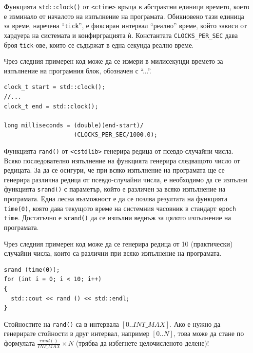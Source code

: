 \documentclass[12pt,a4paper]{article}
\newcommand{\code}[1]{\texttt{#1}}
\begin{document}
{\begin{enumerate}[resume]
\end{enumerate}

\begin{mdframed}[hidealllines=true,backgroundcolor=gray!20]
Функцията \code{std::clock()} от \code{<ctime>} връща в абстрактни единици времето, което е изминало от началото на изпълнение на програмата. Обикновено тази единица за време, наречена ``\code{tick}'', е фиксиран интервал ``реално'' време, който зависи от хардуера на системата и конфирграцията ѝ. Константата \code{CLOCKS\_PER\_SEC} дава броя \code{tick}-ове, които се съдържат в една секунда реално време.

Чрез следния примерен код може да се измери в милисекунди времето за изпълнение на програмния блок, обозначен с ``...''.
\begin{verbatim}
clock_t start = std::clock();
//...
clock_t end = std::clock();

long milliseconds = (double)(end-start)/
                    (CLOCKS_PER_SEC/1000.0);

\end{verbatim}
\end{mdframed}
\begin{mdframed}[hidealllines=true,backgroundcolor=gray!20]
Функцията \code{rand()} от \code{<cstdlib>} генерира редица от псевдо-случайни числа. Всяко последователно изпълнение на функцията генерира следващото число от редицата. За да се осигури, че при всяко изпълнение на програмата ще се генерира различна редица от псевдо-случайни числа, е необходимо да се изпълни функцията \code{srand()} с параметър, който е различен за всяко изпълнение на програмата. Една лесна възможност е да се позлва резултата на функцията \code{time(0)}, която дава текущото време на системния часовник в стандарт \code{epoch time}. Достатъчно е \code{srand()} да се изпълни веднъж за цялото изпълнение на програмата.

Чрез следния примерен код може да се генерира редица от 10 (практически) случайни числа, които са различни при всяко изпълнение на програмата.
\begin{verbatim}
srand (time(0));
for (int i = 0; i < 10; i++)
{
  std::cout << rand () << std::endl;
}
\end{verbatim}
Стойностите на \code{rand()} са в интервала $[0..INT\_MAX]$. Ако е нужно да генерирате стойности в друг интервал, например $[0..N]$, това може да стане по формулата $\frac{rand()}{INT\_MAX}\times N$ (трябва да избегнете целочисленото делене)!
\end{mdframed}

}
\end{document}
